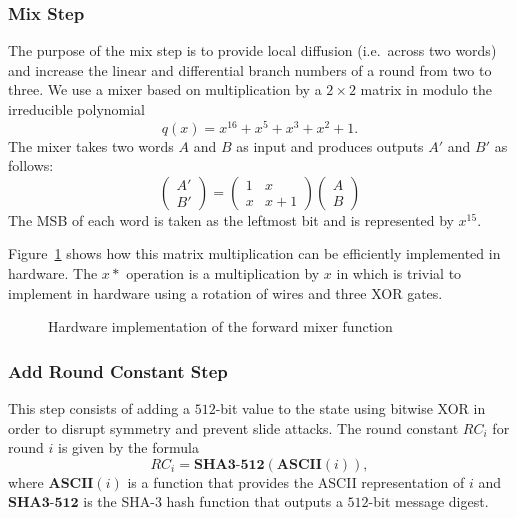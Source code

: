 \subsubsection{Mix Step}
The purpose of the mix step is to provide local diffusion (i.e.\ across two words) and increase the linear and differential branch numbers of a round from two to three.
We use a mixer based on multiplication by a $2 \times 2$ matrix in \gfsixteen modulo the irreducible polynomial
\begin{equation*}
q(x) = x^{16} + x^5 + x^3 + x^2 + 1.
\end{equation*}
The mixer takes two words $A$ and $B$ as input and produces outputs $A'$ and $B'$ as follows:
\begin{equation*}
\begin{pmatrix}
A' \\ B'
\end{pmatrix}
=
\begin{pmatrix}
1 & x \\ x & x + 1
\end{pmatrix}
\begin{pmatrix}
A \\ B
\end{pmatrix}
\end{equation*}
The MSB of each word is taken as the leftmost bit and is represented by $x^{15}$. 

Figure~\ref{fig:MixerMatrix} shows how this matrix multiplication can be efficiently implemented in hardware.
The $x*$ operation is a multiplication by $x$ in \gfsixteen which is trivial to implement in hardware using a rotation of wires and three XOR gates.

\begin{figure}
\centering

\caption{Hardware implementation of the forward mixer function}
\label{fig:MixerMatrix}
\end{figure}

\begin{comment}
\begin{figure}[ht]
\centering

\caption{Hardware implementation of the $x*$ function. The leftmost bit is the MSB.}
\label{fig:xTimes}
\end{figure}
\end{comment}

\subsubsection{Add Round Constant Step}
This step consists of adding a $512$-bit value to the state using bitwise XOR in order to disrupt symmetry and prevent slide attacks.
The round constant $RC_i$ for round $i$ is given by the formula
\begin{equation*}
RC_i = \mathbf{SHA3\textbf{-}512}(\mathbf{ASCII}(i)),
\end{equation*}
where $\mathbf{ASCII}(i)$ is a function that provides the ASCII representation of $i$ and $\mathbf{SHA3\textbf{-}512}$ is the SHA-3 hash function that outputs a $512$-bit message digest. 

